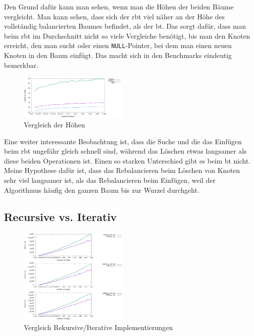 \documentclass[11pt]{article}
\newcommand{\lstin}[1]{\lstinline[language=C]{#1}}
\begin{document}
Den Grund dafür kann man sehen, wenn man die Höhen der beiden Bäume vergleicht. Man kann sehen, dass sich der \gls{rbt} viel näher an der Höhe des vollständig balancierten Baumes befindet, 
als der \gls{bt}. Das sorgt dafür, dass man beim \gls{rbt} im Durchschnitt nicht so viele Vergleiche benötigt, bis man den Knoten erreicht, den man sucht oder einen \lstin{NULL}-Pointer, bei dem 
man einen neuen Knoten in den Baum einfügt. Das macht sich in den Benchmarks eindeutig bemerkbar.  

\begin{figure}[h]
  \centering
  \includegraphics[width=200px]{../benchmark/compare_height.png}
  \caption{Vergleich der Höhen}
\end{figure}

Eine weiter interessante Beobachtung ist, dass die Suche und die das Einfügen beim \gls{rbt} ungefähr gleich schnell sind, während das Löschen etwas langsamer als diese beiden Operationen ist.
Einen so starken Unterschied gibt es beim \gls{bt} nicht. Meine Hypothese dafür ist, dass das Rebalancieren beim Löschen von Knoten sehr viel langsamer ist, als das Rebalancieren beim Einfügen, weil
der Algorithmus häufig den ganzen Baum bis zur Wurzel durchgeht. 

\subsection{Recursive vs. Iterativ} \label{ben2}

\begin{figure}
  \centering
  \includegraphics[width=200px]{../benchmark/compare_insert.png}
  \caption{Vergleich Rekursive/Iterative Implementierungen}
  \label{bir}
\end{figure}
\end{document}
